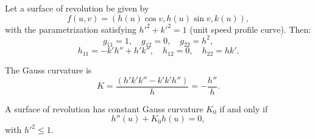 Let a surface of revolution be given by
$$f(u, v) = (h(u) \cos v, h(u) \sin v, k(u)),$$
with the parametrization satisfying $h'^2 + k'^2 = 1$ (unit speed profile curve). Then:
$$g_{11} = 1, \quad g_{12} = 0, \quad g_{22} = h^2,$$
$$h_{11} = -k'h'' + h'k'', \quad h_{12} = 0, \quad h_{22} = hk'.$$

The Gauss curvature is
$$K = \frac{(h'k'k'' - k'k'h'')}{h} = -\frac{h''}{h}.$$

A surface of revolution has constant Gauss curvature $K_0$ if and only if
$$h''(u) + K_0 h(u) = 0,$$
with $h'^2 \leq 1$.
